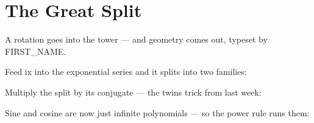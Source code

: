 
\section{The Great Split}

A rotation goes into the tower — and geometry comes out, typeset by {{FIRST_NAME}}.

Feed ix into the exponential series and it splits into two families:



Multiply the split by its conjugate — the twins trick from last week:



Sine and cosine are now just infinite polynomials — so the power rule runs them:


